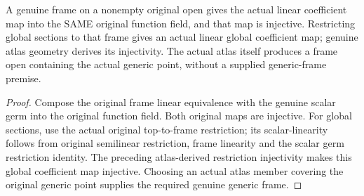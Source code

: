 \begin{theorem}
\label{sc0-generic-line:faithful-frame}
\leanok
A genuine frame on a nonempty original open gives the actual linear
coefficient map into the SAME original function field, and that map is
injective. Restricting global sections to that frame gives an actual
linear global coefficient map; genuine atlas geometry derives its
injectivity. The actual atlas itself produces a frame open containing
the actual generic point, without a supplied generic-frame premise.
\end{theorem}
\begin{proof}
Compose the original frame linear equivalence with the genuine scalar
germ into the original function field. Both original maps are injective.
For global sections, use the actual original top-to-frame restriction;
its scalar-linearity follows from original semilinear restriction,
frame linearity and the scalar germ restriction identity. The preceding
atlas-derived restriction injectivity makes this global coefficient
map injective. Choosing an actual atlas member covering the original
generic point supplies the required genuine generic frame.
\end{proof}

